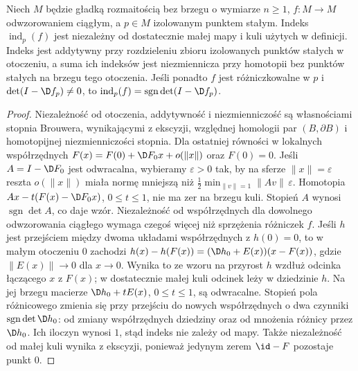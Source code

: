 \begin{stwierdzenie}
Niech $M$ będzie gładką rozmaitością bez brzegu
o wymiarze $n\ge1$, $f:M\to M$ odwzorowaniem ciągłym,
a $p\in M$ izolowanym punktem stałym.
Indeks $\operatorname{ind}_p(f)$ jest niezależny
od dostatecznie małej mapy i kuli użytych w definicji.
Indeks jest addytywny przy rozdzieleniu zbioru
izolowanych punktów stałych w otoczeniu, a suma
ich indeksów jest niezmiennicza przy homotopii
bez punktów stałych na brzegu tego otoczenia.
Jeśli ponadto $f$ jest różniczkowalne w $p$
i $\det(I-\D f_p)\ne0$, to
$\operatorname{ind}_p(f)=\operatorname{sgn}\det(I-\D f_p)$.
\end{stwierdzenie}
\begin{proof}
Niezależność od otoczenia, addytywność i niezmienniczość
są własnościami stopnia Brouwera, wynikającymi
z ekscyzji, względnej homologii par $(B,\partial B)$
i homotopijnej niezmienniczości stopnia.
Dla ostatniej równości w lokalnych współrzędnych
$F(x)=F(0)+\D F_0x+o(\|x\|)$ oraz $F(0)=0$.
Jeśli $A=I-\D F_0$ jest odwracalna, wybieramy
$\varepsilon>0$ tak, by na sferze $\|x\|=\varepsilon$
reszta $o(\|x\|)$ miała normę mniejszą niż
$\tfrac12\min_{\|v\|=1}\|Av\|\,\varepsilon$.
Homotopia $Ax-t(F(x)-\D F_0x)$, $0\le t\le1$,
nie ma zer na brzegu kuli. Stopień $A$ wynosi
$\operatorname{sgn}\det A$, co daje wzór.
Niezależność od współrzędnych dla dowolnego odwzorowania ciągłego
wymaga czegoś więcej niż sprzężenia różniczek $f$.
Jeśli $h$ jest przejściem między dwoma układami współrzędnych
z $h(0)=0$, to w małym otoczeniu $0$ zachodzi
$h(x)-h(F(x))=(\D h_0+E(x))(x-F(x))$,
gdzie $\|E(x)\|\to0$ dla $x\to0$. Wynika to ze wzoru
na przyrost $h$ wzdłuż odcinka łączącego $x$ z $F(x)$;
w dostatecznie małej kuli odcinek leży w dziedzinie $h$.
Na jej brzegu macierze $\D h_0+tE(x)$, $0\le t\le1$,
są odwracalne. Stopień pola różnicowego zmienia się przy
przejściu do nowych współrzędnych o dwa czynniki
$\operatorname{sgn}\det\D h_0$: od zmiany współrzędnych
dziedziny oraz od mnożenia różnicy przez $\D h_0$.
Ich iloczyn wynosi $1$, stąd indeks nie zależy od mapy.
Także niezależność od małej kuli wynika z ekscyzji,
ponieważ jedynym zerem $\id-F$ pozostaje punkt $0$.
\end{proof}

